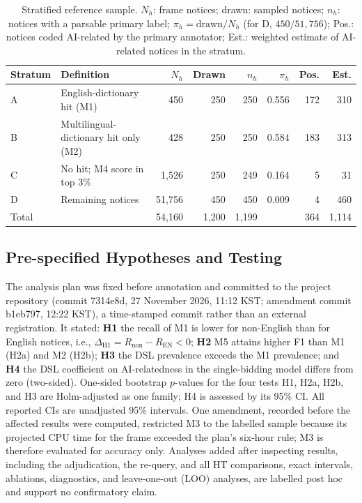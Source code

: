 \documentclass[runningheads]{llncs}
\begin{document}
\begin{table}[t]
\caption{Stratified reference sample. $N_h$: frame notices; drawn: sampled notices; $n_h$: notices with a parsable primary label; $\pi_h=\mathrm{drawn}/N_h$ (for D, $450/51{,}756$); Pos.: notices coded AI-related by the primary annotator; Est.: weighted estimate of AI-related notices in the stratum.}\label{tab:design}
\centering
\begin{tabular}{llrrrrrr}
\toprule
Stratum & Definition & $N_h$ & Drawn & $n_h$ & $\pi_h$ & Pos. & Est. \\
\midrule
A & English-dictionary hit (M1) & 450 & 250 & 250 & 0.556 & 172 & 310 \\
B & Multilingual-dictionary hit only (M2) & 428 & 250 & 250 & 0.584 & 183 & 313 \\
C & No hit; M4 score in top 3\% & 1,526 & 250 & 249 & 0.164 & 5 & 31 \\
D & Remaining notices & 51,756 & 450 & 450 & 0.009 & 4 & 460 \\
\midrule
Total & & 54,160 & 1,200 & 1,199 & & 364 & 1,114 \\
\bottomrule
\end{tabular}
\end{table}

\subsection{Pre-specified Hypotheses and Testing}
The analysis plan was fixed before annotation and committed to the project repository (commit 7314e8d, 27 November 2026, 11:12 KST; amendment commit b1eb797, 12:22 KST), a time-stamped commit rather than an external registration. It stated: \textbf{H1} the recall of M1 is lower for non-English than for English notices, i.e., $\Delta_{\mathrm{H1}}=R_{\mathrm{non}}-R_{\mathrm{EN}}<0$; \textbf{H2} M5 attains higher F1 than M1 (H2a) and M2 (H2b); \textbf{H3} the DSL prevalence exceeds the M1 prevalence; and \textbf{H4} the DSL coefficient on AI-relatedness in the single-bidding model differs from zero (two-sided). One-sided bootstrap $p$-values for the four tests H1, H2a, H2b, and H3 are Holm-adjusted as one family; H4 is assessed by its 95\% CI. All reported CIs are unadjusted 95\% intervals. One amendment, recorded before the affected results were computed, restricted M3 to the labelled sample because its projected CPU time for the frame exceeded the plan's six-hour rule; M3 is therefore evaluated for accuracy only. Analyses added after inspecting results, including the adjudication, the re-query, and all HT comparisons, exact intervals, ablations, diagnostics, and leave-one-out (LOO) analyses, are labelled post hoc and support no confirmatory claim.
\end{document}
